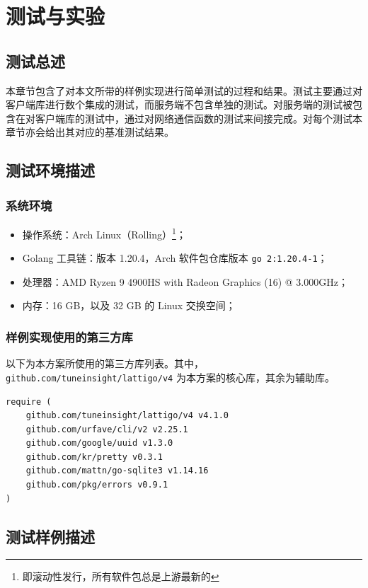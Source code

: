 \chapter{测试与实验}

\section{测试总述}
本章节包含了对本文所带的样例实现进行简单测试的过程和结果。测试主要通过对客户端库进行数个集成的测试，而服务端不包含单独的测试。对服务端的测试被包含在对客户端库的测试中，通过对网络通信函数的测试来间接完成。对每个测试本章节亦会给出其对应的基准测试结果。

\section{测试环境描述}

\subsection{系统环境}

\begin{itemize}
    \item 操作系统：Arch Linux（Rolling）\footnote{即滚动性发行，所有软件包总是上游最新的}；
    \item Golang 工具链：版本 1.20.4，Arch 软件包仓库版本 \verb|go 2:1.20.4-1|；
    \item 处理器：AMD Ryzen 9 4900HS with Radeon Graphics (16) @ 3.000GHz；
    \item 内存：16 GB，以及 32 GB 的 Linux 交换空间；
\end{itemize}

\subsection{样例实现使用的第三方库}

以下为本方案所使用的第三方库列表。其中，\verb|github.com/tuneinsight/lattigo/v4| 为本方案的核心库，其余为辅助库。

\begin{verbatim}
require (
    github.com/tuneinsight/lattigo/v4 v4.1.0
    github.com/urfave/cli/v2 v2.25.1
    github.com/google/uuid v1.3.0
    github.com/kr/pretty v0.3.1
    github.com/mattn/go-sqlite3 v1.14.16
    github.com/pkg/errors v0.9.1
)
\end{verbatim}

\section{测试样例描述}

